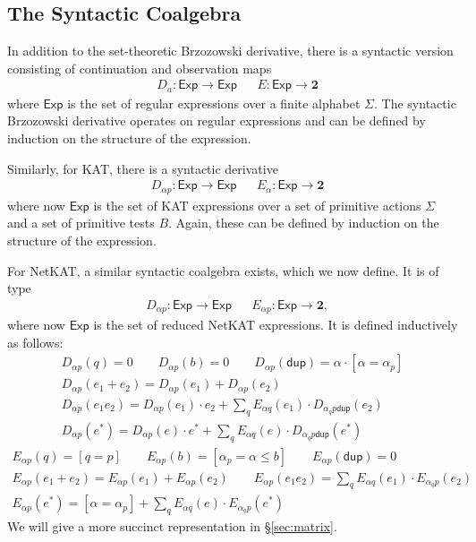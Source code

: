 \documentclass{article}
\newcommand\Two{\mathbf{2}}
\newcommand\Exp{\mathsf{Exp}}
\newcommand\bval[1]{[#1]}
\renewcommand\star{^*}
\newcommand{\netkat}{NetKAT\xspace}
\newcommand{\kw}[1]{\ensuremath{\mathsf{#1}}}
\newcommand{\pdup}{\ensuremath{\mathrel{\kw{dup}}}}
\begin{document}
\subsection{The Syntactic Coalgebra}
\label{sec:syntactic}

In addition to the set-theoretic Brzozowski derivative, there is a syntactic version consisting of continuation and observation maps
\begin{align*}
& D_a:\Exp\to\Exp && E:\Exp\to\Two
\end{align*}
where $\Exp$ is the set of regular expressions over a finite alphabet $\Sigma$. The syntactic Brzozowski derivative operates on regular expressions and can be defined by induction on the structure of the expression.

Similarly, for KAT, there is a syntactic derivative
\begin{align*}
& D_{\alpha p}:\Exp\to\Exp && E_\alpha:\Exp\to\Two
\end{align*}
where now $\Exp$ is the set of KAT expressions over a set of primitive actions $\Sigma$ and a set of primitive tests $B$. Again, these can be defined by induction on the structure of the expression.

For \netkat, a similar syntactic coalgebra exists, which we now define. It is of type
\begin{align*}
& D_{\alpha p}:\Exp\to\Exp && E_{\alpha p}:\Exp\to\Two,
\end{align*}
where now $\Exp$ is the set of reduced \netkat expressions. It is defined inductively as follows:
\begin{gather*}
D_{\alpha p}(q) = 0 \qquad
D_{\alpha p}(b) = 0 \qquad
D_{\alpha p}(\pdup) = \alpha\cdot\bval{\alpha=\alpha_p}\\[1ex]
D_{\alpha p}(e_1+e_2) = D_{\alpha p}(e_1)+D_{\alpha p}(e_2)\\[1ex]
D_{\alpha p}(e_1e_2) = D_{\alpha p}(e_1)\cdot e_2 + \sum_{q} E_{\alpha q}(e_1)\cdot D_{\alpha_qp\pdup}(e_2)\\
D_{\alpha p}(e\star) = D_{\alpha p}(e)\cdot e\star + \sum_{q} E_{\alpha q}(e)\cdot D_{\alpha_qp\pdup}(e\star)
\end{gather*}
\begin{gather*}
E_{\alpha p}(q) = \bval{q = p} \qquad
E_{\alpha p}(b) = \bval{\alpha_p=\alpha\leq b} \qquad
E_{\alpha p}(\pdup) = 0\\[1ex]
E_{\alpha p}(e_1+e_2) = E_{\alpha p}(e_1)+E_{\alpha p}(e_2) \qquad
E_{\alpha p}(e_1e_2) = \sum_{q} E_{\alpha q}(e_1)\cdot E_{\alpha_q p}(e_2)\\
E_{\alpha p}(e\star) = \bval{\alpha=\alpha_p} + \sum_{q} E_{\alpha q}(e)\cdot E_{\alpha_q p}(e\star)
\end{gather*}
We will give a more succinct representation in \S\ref{sec:matrix}.
\end{document}
